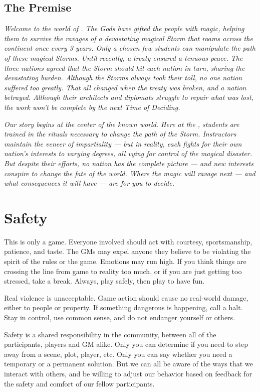 \documentclass[sheet]{GL2020}
\begin{document}
\subsection{The Premise}
\emph{Welcome to the world of \pEarth{}. The Gods have gifted the people with magic, helping them to survive the ravages of a devastating magical Storm that roams across the continent once every 3 years. Only a chosen few students can manipulate the path of these magical Storms. Until recently, a treaty ensured a tenuous peace. The three nations agreed that the Storm should hit each nation in turn, sharing the devastating burden. Although the Storms always took their toll, no one nation suffered too greatly. That all changed when the treaty was broken, and a nation betrayed. Although their architects and diplomats struggle to repair what was lost, the work won't be complete by the next Time of Deciding.}

\emph{Our story begins at the center of the known world. Here at the \pSchool{}, students are trained in the rituals necessary to change the path of the Storm. Instructors maintain the veneer of impartiality — but in reality, each fights for their own nation's interests to varying degrees, all vying for control of the magical disaster. But despite their efforts, no nation has the complete picture — and new interests conspire to change the fate of the world. Where the magic will ravage next — and what consequences it will have — are for you to decide.}


\section{Safety}
This is only a game. Everyone involved should act with courtesy, sportsmanship, patience, and taste. The GMs may expel anyone they believe to be violating the spirit of the rules or the game. Emotions may run high. If you think things are crossing the line from game to reality too much, or if you are just getting too stressed, take a break. Always, play safely, then play to have fun. 

Real violence is unacceptable. Game action should cause no real-world damage, either to people or property. If something dangerous is happening, call a halt. Stay in control, use common sense, and do not endanger yourself or others.

Safety is a shared responsibility in the community, between all of the participants, players and GM alike. Only you can determine if you need to step away from a scene, plot, player, etc. Only you can say whether you need a temporary or a permanent solution. But we can all be aware of the ways that we interact with others, and be willing to adjust our behavior based on feedback for the safety and comfort of our fellow participants.
\end{document}
